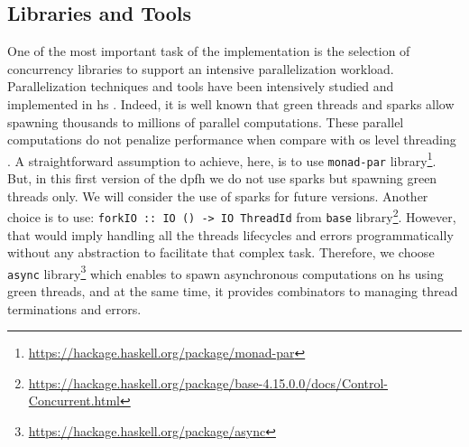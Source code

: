 \subsection{Libraries and Tools}
One of the most important task of the implementation is the selection of concurrency libraries to support an intensive parallelization workload. Parallelization techniques and tools have been intensively studied and implemented in \acrshort{hs} \cite{monadpar}. 
Indeed, it is well known that green threads and sparks allow spawning thousands to millions of parallel computations. 
These parallel computations do not penalize performance when compare with \acrfull{os} level threading \cite{parallelbook}. 
A straightforward assumption to achieve, here, is to use \texttt{monad-par} library\footnote{\url{https://hackage.haskell.org/package/monad-par}}. 
But, in this first version of the \acrshort{dpfh} we do not use  sparks \cite{sparks1, sparks} but spawning green threads only. We will consider the use of sparks for future versions.
Another choice is to use:
\texttt{forkIO :: IO () -> IO ThreadId} from \texttt{base} library\footnote{\url{https://hackage.haskell.org/package/base-4.15.0.0/docs/Control-Concurrent.html}}. 
However, that would imply handling all the threads lifecycles and errors programmatically without any abstraction to facilitate that complex task. 
Therefore, we choose \texttt{async} library\footnote{\url{https://hackage.haskell.org/package/async}} which enables to spawn asynchronous computations \cite{parallelbook} on \acrshort{hs} using green threads, and at the same time, it provides combinators to managing thread terminations and errors.

